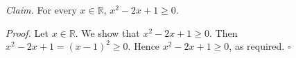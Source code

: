 \textit{Claim.} For every $x \in \mathbb{R}$, $x^{2} - 2x + 1 \geq 0$.

\textit{Proof.} Let $x \in \mathbb{R}$.
We show that $x^{2} - 2x + 1 \geq 0$.
Then $x^{2} - 2x + 1 = (x - 1)^{2} \geq 0$.
Hence $x^{2} - 2x + 1 \geq 0$, as required. \hfill$\square$